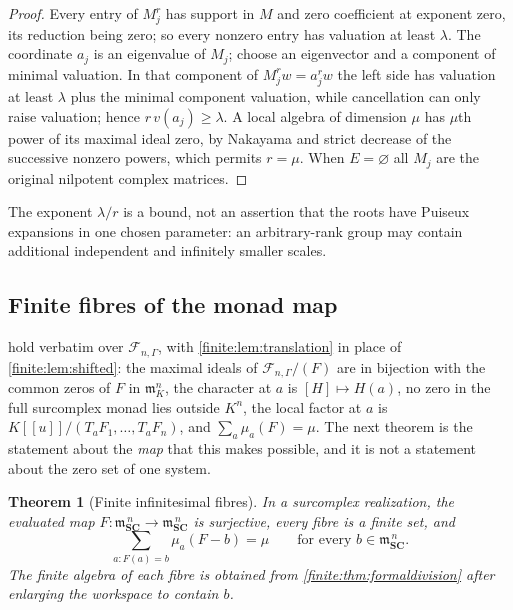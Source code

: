 \documentclass[11pt,letterpaper]{article}
\newtheorem{theorem}{Theorem}[section]
\theoremstyle{definition}
\theoremstyle{remark}
\newcommand{\SC}{\mathbf{SC}}
\newcommand{\Af}{\mathscr F}
\newcommand{\mm}{\mathfrak m}
\numberwithin{equation}{section}
\begin{document}
\begin{proof}
Every entry of $M_j^r$ has support in $M$ and zero coefficient at exponent zero, its reduction being zero; so every nonzero entry has valuation at least $\lambda$. The coordinate $a_j$ is an eigenvalue of $M_j$; choose an eigenvector and a component of minimal valuation. In that component of $M_j^rw=a_j^rw$ the left side has valuation at least $\lambda$ plus the minimal component valuation, while cancellation can only raise valuation; hence $r\,v(a_j)\geq\lambda$. A local algebra of dimension $\mu$ has $\mu$th power of its maximal ideal zero, by Nakayama and strict decrease of the successive nonzero powers, which permits $r=\mu$. When $E=\varnothing$ all $M_j$ are the original nilpotent complex matrices.
\end{proof}

The exponent $\lambda/r$ is a bound, not an assertion that the roots have Puiseux expansions in one chosen parameter: an arbitrary-rank group may contain additional independent and infinitely smaller scales.

\subsection{Finite fibres of the monad map}
\label{finite:sec:fibres}

 hold verbatim over $\Af_{n,\Gamma}$, with \cref{finite:lem:translation} in place of \cref{finite:lem:shifted}: the maximal ideals of $\Af_{n,\Gamma}/(F)$ are in bijection with the common zeros of $F$ in $\mm_K^n$, the character at $a$ is $[H]\mapsto H(a)$, no zero in the full surcomplex monad lies outside $K^n$, the local factor at $a$ is $K[[u]]/(T_aF_1,\ldots,T_aF_n)$, and $\sum_a\mu_a(F)=\mu$. The next theorem is the statement about the \emph{map} that this makes possible, and it is not a statement about the zero set of one system.

\begin{theorem}[Finite infinitesimal fibres]
\label{finite:thm:fibres}
In a surcomplex realization, the evaluated map $F:\mm_{\SC}^{\,n}\to\mm_{\SC}^{\,n}$ is surjective, every fibre is a finite set, and
\begin{equation}\label{finite:eq:fibres}
 \sum_{a:F(a)=b}\mu_a(F-b)=\mu
 \qquad\text{for every }b\in\mm_{\SC}^{\,n}.
\end{equation}
The finite algebra of each fibre is obtained from \cref{finite:thm:formaldivision} after enlarging the workspace to contain $b$.
\end{theorem}
\end{document}
